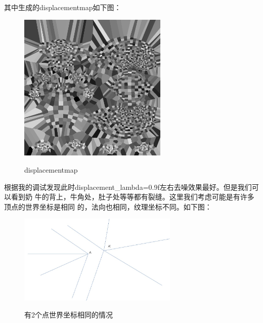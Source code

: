 \documentclass{article}
\begin{document}
	 其中生成的displacementmap如下图：
	\begin{figure}[htb]
		\caption{\label{table.label} displacementmap} \centering
		\begin{center}
			\includegraphics[width=2.8in]{1_denoise_displacement_map.png}
			\label{figure.label}
		\end{center}
	\end{figure}
	\clearpage
	根据我的调试发现此时displacement\_lambda=0.9f左右去噪效果最好。但是我们可以看到奶
	牛的背上，牛角处，肚子处等等都有裂缝。这里我们考虑可能是有许多顶点的世界坐标是相同
	的，法向也相同，纹理坐标不同。如下图：
	\begin{figure}[htb]
		\caption{\label{table.label} 有2个点世界坐标相同的情况} \centering
		\begin{center}
			\includegraphics[width=3in]{overlap.jpg}
			\label{figure.label}
		\end{center}
	\end{figure}
	
\end{document}
